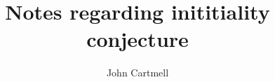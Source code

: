 \documentclass[10pt,a4paper]{article}
\theoremstyle{remark}
\begin{document}
\title{Notes regarding inititiality conjecture}

\author{John Cartmell}

\maketitle

\newcommand{\CofU}{\ccat[C](\gat[U])}
\newcommand{\KU}{K_{\gat[U]}}
\newcommand{\KUp}{K_{\gat[U']}}
\newcommand{\catCon}{\cat{Con}}
\newcommand{\catGAT}{\cat{GAT}}

 



% 


\end{document}
